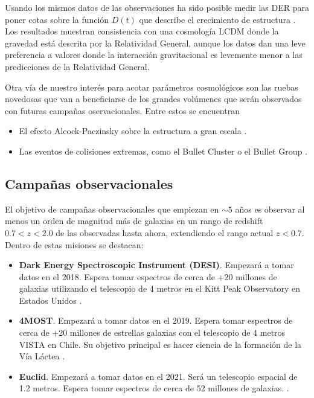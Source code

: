 Usando los mismos datos de las observaciones ha sido posible
medir las DER para poner cotas sobre la funci\'on $D(t)$ que describe
el crecimiento de estructura \cite{2014MNRAS.439.3504S}. 
Los resultados muestran consistencia con una cosmolog\'ia LCDM donde la
gravedad est\'a descrita por la Relatividad General, aunque los datos
dan una leve preferencia a valores donde la interacci\'on
gravitacional es levemente menor a las predicciones de la Relatividad
General. 

Otra v\'ia de nuestro inter\'es para acotar par\'ametros
cosmol\'ogicos son las ruebas novedosas que van a beneficiarse de los
grandes vol\'umenes que ser\'an observados con futuras campa\~nas
oservacionales. Entre estos se encuentran 

\begin{itemize}
\item El efecto Alcock-Paczinsky sobre la estructura a gran escala \cite{2013arXiv1309.1162S}.
\item Las eventos de colisiones extremas, como el Bullet Cluster o el
  Bullet Group \cite{Bullets2010, Bullets2014}. 
\end{itemize}


\subsection{Campa\~nas observacionales}

El objetivo de campa\~nas observacionales que empiezan en $\sim 5$
a\~nos es observar al menos un orden de magnitud m\'as de galaxias en
un rango de redshift $0.7<z<2.0$ de las observadas hasta ahora,
extendiendo el rango actual $z<0.7$. Dentro de estas misiones se destacan:

\begin{itemize}
\item {\bf Dark Energy Spectroscopic Instrument (DESI)}. Empezar\'a a
  tomar datos en el 2018. Espera tomar espectros de cerca de +20 millones de
  galaxias utilizando el telescopio de 4 metros en el Kitt Peak
  Observatory en Estados Unidos \cite{DESI}.
\item {\bf 4MOST}. Empezar\'a a tomar datos en el 2019. Espera
  tomar espectros de cerca de +20 millones de estrellas galaxias con el
  telescopio de 4 metros VISTA en Chile. Su objetivo principal es
  hacer ciencia de la formaci\'on de la V\'ia L\'actea \cite{4MOST}.
\item {\bf Euclid}. Empezar\'a a tomar datos en el 2021. Ser\'a un
  telescopio espacial de 1.2 metros. Espera tomar espectros de cerca
  de 52 millones de galaxias. \cite{EUCLID}.
\end{itemize}

